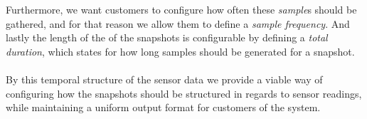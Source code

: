 Furthermore, we want customers to configure how often these \emph{sample}s should be gathered, and for that reason we allow them to define a \emph{sample frequency}. And lastly the length of the of the snapshots is configurable by defining a \emph{total duration}, which states for how long samples should be generated for a snapshot.
\\\\
By this temporal structure of the sensor data we provide a viable way of configuring how the snapshots should be structured in regards to sensor readings, while maintaining a uniform output format for customers of the system.

